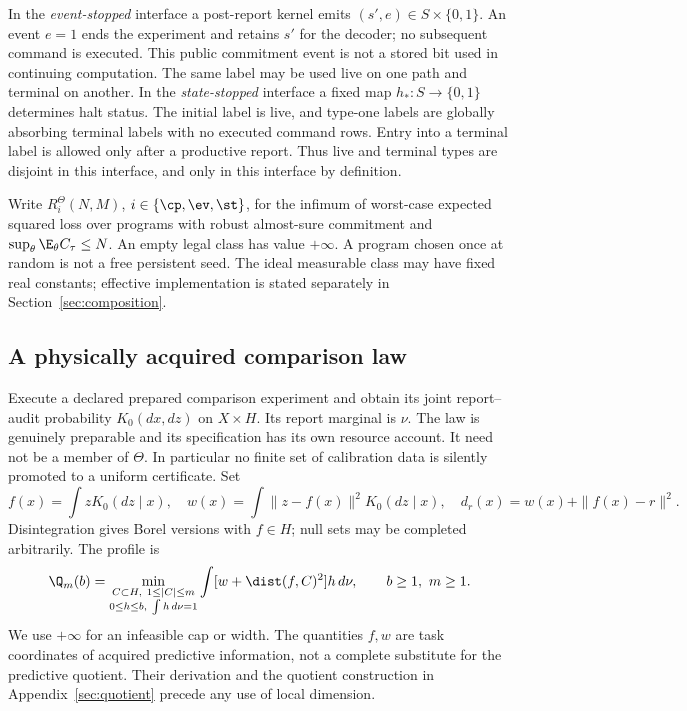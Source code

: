 In the \emph{event-stopped} interface a post-report kernel emits $(s',e)\in S\times\{0,1\}$. An event $e=1$ ends the experiment and retains $s'$ for the decoder; no subsequent command is executed. This public commitment event is not a stored bit used in continuing computation. The same label may be used live on one path and terminal on another. In the \emph{state-stopped} interface a fixed map $h_*:S\to\{0,1\}$ determines halt status. The initial label is live, and type-one labels are globally absorbing terminal labels with no executed command rows. Entry into a terminal label is allowed only after a productive report. Thus live and terminal types are disjoint in this interface, and only in this interface by definition.

Write $R_i^\Theta(N,M)$, $i\in\{\cp,\ev,\st\}$, for the infimum of worst-case expected squared loss over programs with robust almost-sure commitment and $\sup_\theta\E_\theta C_\tau\le N$. An empty legal class has value $+\infty$. A program chosen once at random is not a free persistent seed. The ideal measurable class may have fixed real constants; effective implementation is stated separately in Section~\ref{sec:composition}.

\subsection*{A physically acquired comparison law}
Execute a declared prepared comparison experiment and obtain its joint report--audit probability $K_0(dx,dz)$ on $X\times H$. Its report marginal is $\nu$. The law is genuinely preparable and its specification has its own resource account. It need not be a member of $\Theta$. In particular no finite set of calibration data is silently promoted to a uniform certificate. Set
\begin{equation}\label{eq:derived}
 f(x)=\int zK_0(dz\mid x),\quad
 w(x)=\int\|z-f(x)\|^2K_0(dz\mid x),\quad
 d_r(x)=w(x)+\|f(x)-r\|^2.
\end{equation}
Disintegration gives Borel versions with $f\in H$; null sets may be completed arbitrarily. The profile is
\begin{equation}\label{eq:profile}
 \Q_m(b)=\min_{\substack{C\subset H,\ 1\le|C|\le m\\
                  0\le h\le b,\ \int h\,d\nu=1}}
        \int [w+\dist(f,C)^2]h\,d\nu,
 \qquad b\ge1,\ m\ge1.
\end{equation}
We use $+\infty$ for an infeasible cap or width. The quantities $f,w$ are task coordinates of acquired predictive information, not a complete substitute for the predictive quotient. Their derivation and the quotient construction in Appendix~\ref{sec:quotient} precede any use of local dimension.

